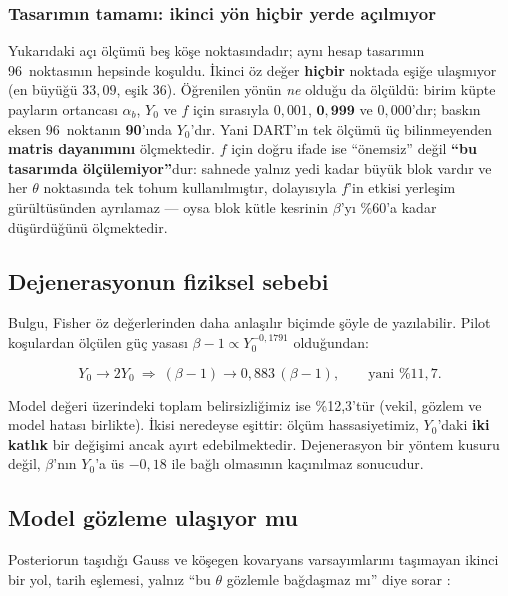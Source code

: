 \documentclass[12pt,a4paper]{article}
\newcommand{\havuzToplam}{96}
\begin{document}
\subsubsection*{Tasarımın tamamı: ikinci yön hiçbir yerde açılmıyor}

Yukarıdaki açı ölçümü beş köşe noktasındadır; aynı hesap tasarımın
\havuzToplam\ noktasının hepsinde koşuldu. İkinci öz değer
\textbf{hiçbir} noktada eşiğe ulaşmıyor (en büyüğü $33{,}09$, eşik 36).
Öğrenilen yönün \emph{ne} olduğu da ölçüldü: birim küpte payların
ortancası $\alpha_b$, $Y_0$ ve $f$ için sırasıyla $0{,}001$,
$\mathbf{0{,}999}$ ve $0{,}000$'dır; baskın eksen \havuzToplam\
noktanın \textbf{90}'ında $Y_0$'dır. Yani DART'ın tek ölçümü üç
bilinmeyenden \textbf{matris dayanımını} ölçmektedir. $f$ için doğru
ifade ise ``önemsiz'' değil \textbf{``bu tasarımda ölçülemiyor''}dur:
sahnede yalnız yedi kadar büyük blok vardır ve her $\theta$ noktasında
tek tohum kullanılmıştır, dolayısıyla $f$'in etkisi yerleşim
gürültüsünden ayrılamaz --- oysa \citet{raducan2022bloklar} blok kütle
kesrinin $\beta$'yı \%60'a kadar düşürdüğünü ölçmektedir.

\subsection{Dejenerasyonun fiziksel sebebi}

Bulgu, Fisher öz değerlerinden daha anlaşılır biçimde şöyle de
yazılabilir. Pilot koşulardan ölçülen güç yasası
$\beta-1 \propto Y_0^{-0{,}1791}$ olduğundan:

\begin{equation}
Y_0 \to 2Y_0 \ \Longrightarrow\ (\beta-1) \to 0{,}883\,(\beta-1),
\qquad \text{yani } \%11{,}7 .
\label{esit:yukseltec}
\end{equation}

Model değeri üzerindeki toplam belirsizliğimiz ise \%12,3'tür (vekil,
gözlem ve model hatası birlikte). İkisi neredeyse eşittir: ölçüm
hassasiyetimiz, $Y_0$'daki \textbf{iki katlık} bir değişimi ancak ayırt
edebilmektedir. Dejenerasyon bir yöntem kusuru değil, $\beta$'nın
$Y_0$'a üs $-0{,}18$ ile bağlı olmasının kaçınılmaz sonucudur.

\subsection{Model gözleme ulaşıyor mu}

Posteriorun taşıdığı Gauss ve köşegen kovaryans varsayımlarını
taşımayan ikinci bir yol, tarih eşlemesi, yalnız ``bu $\theta$ gözlemle
bağdaşmaz mı'' diye sorar \citep{vernon2014}:
\end{document}
